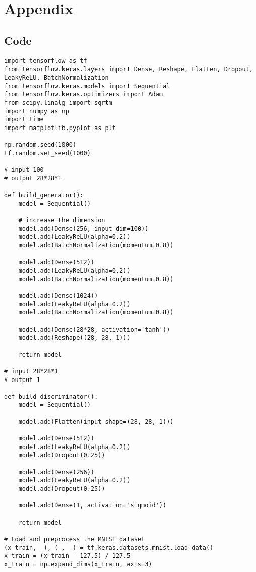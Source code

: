 \chapter{Appendix}
\label{Code}
\section*{Code}

\begin{lstlisting}[style=mypython, caption=GAN model with dense layers]
import tensorflow as tf
from tensorflow.keras.layers import Dense, Reshape, Flatten, Dropout, LeakyReLU, BatchNormalization
from tensorflow.keras.models import Sequential
from tensorflow.keras.optimizers import Adam
from scipy.linalg import sqrtm
import numpy as np
import time
import matplotlib.pyplot as plt

np.random.seed(1000)
tf.random.set_seed(1000)

# input 100
# output 28*28*1

def build_generator():
    model = Sequential()
    
    # increase the dimension
    model.add(Dense(256, input_dim=100))
    model.add(LeakyReLU(alpha=0.2))
    model.add(BatchNormalization(momentum=0.8))
    
    model.add(Dense(512))
    model.add(LeakyReLU(alpha=0.2))
    model.add(BatchNormalization(momentum=0.8))
    
    model.add(Dense(1024))
    model.add(LeakyReLU(alpha=0.2))
    model.add(BatchNormalization(momentum=0.8))
    
    model.add(Dense(28*28, activation='tanh'))
    model.add(Reshape((28, 28, 1)))

    return model

# input 28*28*1
# output 1

def build_discriminator():
    model = Sequential()
    
    model.add(Flatten(input_shape=(28, 28, 1)))
    
    model.add(Dense(512))
    model.add(LeakyReLU(alpha=0.2))
    model.add(Dropout(0.25))
    
    model.add(Dense(256))
    model.add(LeakyReLU(alpha=0.2))
    model.add(Dropout(0.25))
    
    model.add(Dense(1, activation='sigmoid'))

    return model

# Load and preprocess the MNIST dataset
(x_train, _), (_, _) = tf.keras.datasets.mnist.load_data()
x_train = (x_train - 127.5) / 127.5
x_train = np.expand_dims(x_train, axis=3)


\end{lstlisting}
